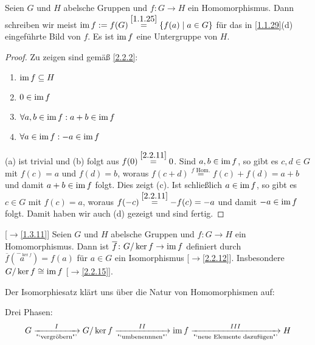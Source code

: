 \documentclass[../../main.tex]{subfiles}
\begin{document}
\begin{notpro}\label{2.3.13}
Seien $G$ und $H$ abelsche Gruppen und $f\colon G\to H$ ein Homomorphismus. Dann schreiben wir meist $\operatorname{im} f:=f(G)\overset{\ref{1.1.25}}=\{f(a)\mid a\in G\}$
für das in {\rm\ref{1.1.29}(d)} eingeführte Bild von $f$. Es ist $\operatorname{im} f$ eine Untergruppe von $H$.
\end{notpro}
\begin{proof}
Zu zeigen sind gemäß \ref{2.2.2}:
\begin{enumerate}[\normalfont(a)]
\item $\operatorname{im} f\subseteq H$
\item $0\in\operatorname{im} f$
\item $\forall a,b\in\operatorname{im} f:a+b\in\operatorname{im} f$
\item $\forall a\in\operatorname{im} f:-a\in\operatorname{im} f$
\end{enumerate}
(a) ist trivial und (b) folgt aus $f(0)\overset{\ref{2.2.11}}=0$. Sind $a,b\in\operatorname{im} f$, so gibt es $c,d\in G$ mit $f(c)=a$ und $f(d)=b$, woraus $f(c+d)\overset{\text{$f$ Hom.}}=f(c)+f(d)=a+b$
und damit $a+b\in\operatorname{im} f$ folgt. Dies zeigt (c). Ist schließlich $a\in\operatorname{im} f$, so gibt es $c\in G$ mit $f(c)=a$, woraus $f(-c)\overset{\ref{2.2.11}}=-f(c)=-a$ und damit $-a\in\operatorname{im} f$ folgt. Damit haben wir auch (d) gezeigt und sind fertig.
\end{proof}

\begin{kor}\label{2.3.14} {\rm[$\to$\ref{1.3.11}]}
Seien $G$ und $H$ abelsche Gruppen und $f\colon G\to H$ ein Homomorphismus.
Dann ist $\overline f\colon G/\ker f\to\operatorname{im} f$
definiert durch $\overline f(\overset{-_{\ker f}}{a~~})=f(a)$ für $a\in G$ ein Isomorphismus {\rm[$\to$\ref{2.2.12}]}. Insbesondere $G/\ker f\cong\operatorname{im} f$ {\rm[$\to$\ref{2.2.15}]}.
\end{kor}

\begin{bem}\label{2.3.15}
Der Isomorphiesatz klärt uns über die Natur von Homomorphismen auf:
\begin{center}
\end{center}
Drei Phasen:
$$G\xrightarrow[\text{"`vergröbern"'}]{I} G/\ker f\xrightarrow[\text{"`umbenennnen"'}]{II}\operatorname{im} f\xrightarrow[\text{"`neue Elemente dazufügen"'}]{III}H$$
\end{bem}
\end{document}
